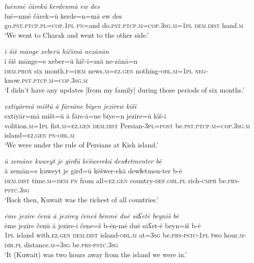 \ea \label{ŽM.34}
\textit{luēnmē čārekū kerdenmā ew des} \\ 
\gll luē=nmē čārek=ū kerde=n=mā ew des \\ 
 go\textsc{.pst}\textsc{.ptcp}\textsc{.pl}\textsc{=cop}\textsc{.\textsc{1pl}} \textsc{pn}=and do\textsc{.pst}\textsc{.ptcp}\textsc{.m}\textsc{=cop}\textsc{.3sg}\textsc{.m}\textsc{=\textsc{1pl}} \textsc{dem.dist} hand\textsc{.m} \\ 
\glt `We went to Charak and went to the other side.'
\z 
 
\ea \label{ŽM.36}
\textit{ī šiš mānge xeberū hīčīmā nezānān} \\ 
\gll ī šiš mānge=e xeber=ū hīč-ī=mā ne-zānā=n \\ 
 \textsc{dem.prox} six month\textsc{.f}\textsc{=dem} news\textsc{.m}\textsc{=ez.gen} nothing\textsc{-obl}\textsc{.m}\textsc{=\textsc{1pl}} \textsc{neg-}know\textsc{.pst}\textsc{.ptcp}\textsc{.m}\textsc{=cop}\textsc{.3sg}\textsc{.m} \\ 
\glt `I didn’t have any updates [from my family] during those periods of six months.'
\z 
 
\ea \label{ŽM.38}
\textit{extīyārmā mištū ā fārsāne bīyen jezīrew kīšī} \\ 
\gll extīyār=mā mišt=ū ā fārs-ā=ne bīye=n jezīre=ū kīš-ī \\ 
 volition\textsc{.m}\textsc{=\textsc{1pl}} fist\textsc{.m}\textsc{=ez.gen} \textsc{dem.dist} Persian\textsc{-3pl}\textsc{=\textsc{post}} be\textsc{.pst}\textsc{.ptcp}\textsc{.m}\textsc{=cop}\textsc{.3sg}\textsc{.m} island\textsc{=ez.gen} \textsc{pn}\textsc{-obl}\textsc{.m} \\ 
\glt `We were under the rule of Persians at Kish island.'
\z 
 
\ea \label{ŽM.43}
\textit{ā zemāne kuweyt je girđū kēšwerekā dewɫetmenter bē} \\ 
\gll ā zemān=e kuweyt je girđ=ū kēšwer-ekā dewɫetmen-ter b-ē \\ 
 \textsc{dem.dist} time\textsc{.m}\textsc{=dem} \textsc{pn} from all\textsc{=ez.gen} country\textsc{-def}\textsc{.obl}\textsc{.pl} rich\textsc{-cmpr} be\textsc{.prs}\textsc{-pstc}\textsc{.3sg} \\ 
\glt `Back then, Kuwait was the richest of all countries.'
\z 
 
\ea \label{ŽM.45}
\textit{ēme jezīre čenū ā jezīrey čeneš bēnmē duē sāʕetē beyniš bē} \\ 
\gll ēme jezīre čenū ā jezīre-ī čene=š b-ēn-mē duē sāʕet-ē beyn=iš b-ē \\ 
 \textsc{1pl} island with\textsc{\textsc{.ez}.gen} \textsc{dem.dist} island\textsc{-obl}\textsc{.m} at\textsc{=3sg} be\textsc{.prs}\textsc{-pstc}\textsc{-\textsc{1pl}} two hour\textsc{.m}\textsc{-dir}\textsc{.pl} distance\textsc{.m}\textsc{=3sg} be\textsc{.prs}\textsc{-pstc}\textsc{.3sg} \\ 
\glt `It (Kuwait) was two hours away from the island we were in.'
\z 
 

